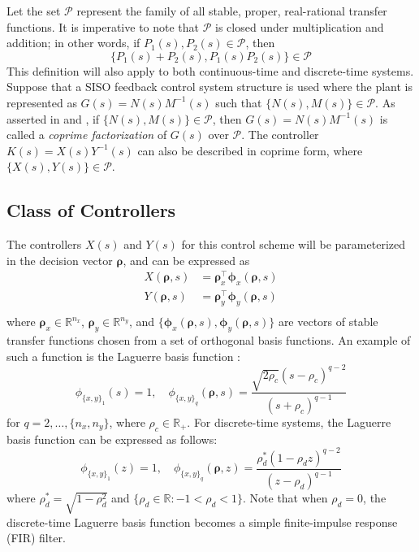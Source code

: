 \documentclass[letterpaper, 10 pt, conference]{ieeeconf}  %
\begin{document}
Let the set $\mathscr{P}$ represent the family of all stable, proper, real-rational transfer functions. It is imperative to note that $\mathscr{P}$ is closed under multiplication and addition; in other words, if $P_1(s),P_2(s) \in \mathscr{P}$, then 
\begin{equation}
\{ P_1(s)+P_2(s),P_1(s)P_2(s)\} \in \mathscr{P}
\end{equation}
This definition will also apply to both continuous-time and discrete-time systems. Suppose that a SISO feedback control system structure is used where the plant is represented as $G(s) = N(s)M^{-1}(s)$ such that $\{N(s),M(s)\} \in \mathscr{P}$. As asserted in \cite{ZD98} and \cite{DFT92}, if $\{N(s), M(s)\} \in \mathscr{P}$, then $G(s) = N(s)M^{-1}(s)$ is called a \textit{coprime factorization} of $G(s)$ over $\mathscr{P}$. The controller $K(s) =X(s)Y^{-1}(s)$ can also be described in coprime form, where $\{X(s), Y(s)\} \in \mathscr{P}$.


\subsection{Class of Controllers}
The controllers $X(s)$ and $Y(s)$ for this control scheme will be parameterized in the decision vector $\bm{\rho}$, and can be expressed as
\begin{equation}
\begin{aligned} \label{eq:cont}
X(\bm{\rho},s) &= \bm{\rho}_x^{\top} \bm{\phi}_x(\bm{\rho},s)\\
Y(\bm{\rho},s) &= \bm{\rho}_y^{\top} \bm{\phi}_y(\bm{\rho},s)\\
\end{aligned}
\end{equation}
where $\bm{\rho}_x \in \mathbb{R}^{n_x}$, $\bm{\rho}_y \in \mathbb{R}^{n_y}$, and $\{\bm{\phi}_x(\bm{\rho},s), \bm{\phi}_y(\bm{\rho},s)\}$ are vectors of stable transfer functions chosen from a set of orthogonal basis functions. An example of such a function is the Laguerre basis function \cite{Kar13}:
\begin{equation} \label{eq:Laguerre}
\phi_{\{x,y\}_1}(s)=1,\quad \phi_{\{x,y\}_q}(\bm{\rho},s) = \frac{\sqrt{2 \rho_c}(s-\rho_c)^{q-2}}{(s+\rho_c)^{q-1}}
\end{equation}
for $q = 2,\ldots,\{n_x,n_y\}$, where $\rho_c \in \mathbb{R}_+$. For discrete-time systems, the Laguerre basis function can be expressed as follows:
\begin{equation} \label{eq:Laguerre_z}
\phi_{\{x,y\}_1}(z)=1,\quad \phi_{\{x,y\}_q}(\bm{\rho},z) = \frac{\rho_d^*(1-\rho_d z)^{q-2}}{(z-\rho_d)^{q-1}}
\end{equation}
where $\rho_d^* = \sqrt{1-\rho_d^2}$ and $\{\rho_d \in \mathbb{R}: -1 < \rho_d < 1\}$. Note that when $\rho_d = 0$, the discrete-time Laguerre basis function becomes a simple finite-impulse response (FIR) filter.
\end{document}
